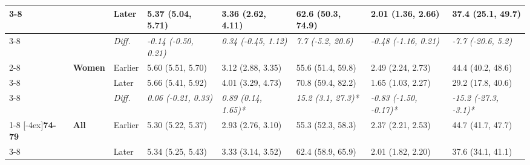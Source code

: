 \documentclass[12pt, a4paper]{article}
\begin{document}
\begin{appendices}
\begin{table}[!p]
{\begin{tabular}[t]{>{}l>{}lllllll}
        \cmidrule{3-8}
                                              &                                 & Later                         & 5.37 (5.04, 5.71)                           & 3.36 (2.62, 4.11)                            & 62.6 (50.3, 74.9)                           & 2.01 (1.36, 2.66)                               & 37.4 (25.1, 49.7)                              \\
        \cmidrule{3-8}
                                              &                                 & \cellcolor{gray!10}\em{Diff.} & \cellcolor{gray!10}\em{-0.14 (-0.50, 0.21)} & \cellcolor{gray!10}\em{0.34 (-0.45, 1.12)}   & \cellcolor{gray!10}\em{7.7 (-5.2, 20.6)}    & \cellcolor{gray!10}\em{-0.48 (-1.16, 0.21)}     & \cellcolor{gray!10}\em{-7.7 (-20.6, 5.2)}      \\
        \cmidrule{2-8}
                                              & \multirow{3}{*}{\textbf{Women}} & Earlier                       & 5.60 (5.51, 5.70)                           & 3.12 (2.88, 3.35)                            & 55.6 (51.4, 59.8)                           & 2.49 (2.24, 2.73)                               & 44.4 (40.2, 48.6)                              \\
        \cmidrule{3-8}
                                              &                                 & Later                         & 5.66 (5.41, 5.92)                           & 4.01 (3.29, 4.73)                            & 70.8 (59.4, 82.2)                           & 1.65 (1.03, 2.27)                               & 29.2 (17.8, 40.6)                              \\
        \cmidrule{3-8}
                                              &                                 & \cellcolor{gray!10}\em{Diff.} & \cellcolor{gray!10}\em{0.06 (-0.21, 0.33)}  & \cellcolor{gray!10}\em{0.89 (0.14, 1.65)*}   & \cellcolor{gray!10}\em{15.2 (3.1, 27.3)*}   & \cellcolor{gray!10}\em{-0.83 (-1.50, -0.17)*}   & \cellcolor{gray!10}\em{-15.2 (-27.3, -3.1)*}   \\
        \cmidrule{1-8}
        \multirow{9}{*}[-4ex]{\textbf{74-79}} & \multirow{3}{*}{\textbf{All}}   & Earlier                       & 5.30 (5.22, 5.37)                           & 2.93 (2.76, 3.10)                            & 55.3 (52.3, 58.3)                           & 2.37 (2.21, 2.53)                               & 44.7 (41.7, 47.7)                              \\
        \cmidrule{3-8}
                                              &                                 & Later                         & 5.34 (5.25, 5.43)                           & 3.33 (3.14, 3.52)                            & 62.4 (58.9, 65.9)                           & 2.01 (1.82, 2.20)                               & 37.6 (34.1, 41.1)                              \\

\end{tabular}}
\end{table}
\end{appendices}
\end{document}
